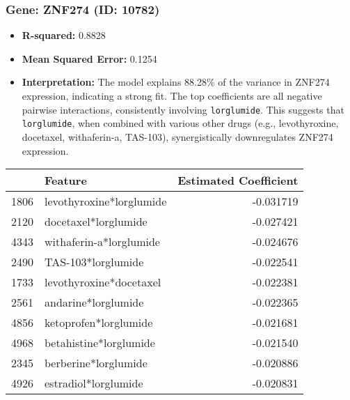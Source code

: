 \documentclass[12pt]{article}
\begin{document}
\subsubsection{Gene: ZNF274 (ID: 10782)}
\begin{itemize}
    \item \textbf{R-squared:} 0.8828
    \item \textbf{Mean Squared Error:} 0.1254
    \item \textbf{Interpretation:} The model explains 88.28\% of the variance in ZNF274 expression, indicating a strong fit. The top coefficients are all negative pairwise interactions, consistently involving \texttt{lorglumide}. This suggests that \texttt{lorglumide}, when combined with various other drugs (e.g., levothyroxine, docetaxel, withaferin-a, TAS-103), synergistically downregulates ZNF274 expression.
\end{itemize}
\begin{tabularx}{\textwidth}{l X r}
\toprule
{} & Feature & Estimated Coefficient \\
\midrule
1806 & levothyroxine*lorglumide & -0.031719 \\
2120 & docetaxel*lorglumide & -0.027421 \\
4343 & withaferin-a*lorglumide & -0.024676 \\
2490 & TAS-103*lorglumide & -0.022541 \\
1733 & levothyroxine*docetaxel & -0.022381 \\
2561 & andarine*lorglumide & -0.022365 \\
4856 & ketoprofen*lorglumide & -0.021681 \\
4968 & betahistine*lorglumide & -0.021540 \\
2345 & berberine*lorglumide & -0.020886 \\
4926 & estradiol*lorglumide & -0.020831 \\
\bottomrule
\end{tabularx}
\end{document}
